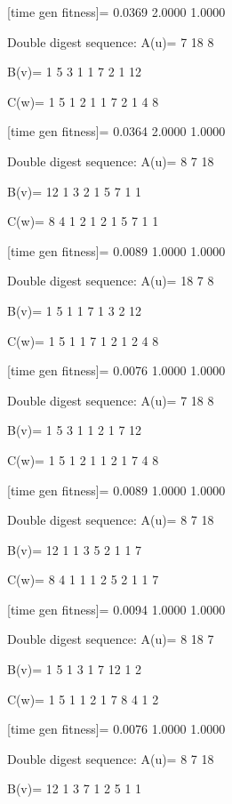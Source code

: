 [time gen fitness]=
    0.0369    2.0000    1.0000

Double digest sequence:
A(u)=
     7    18     8

B(v)=
     1     5     3     1     1     7     2     1    12

C(w)=
     1     5     1     2     1     1     7     2     1     4     8

[time gen fitness]=
    0.0364    2.0000    1.0000

Double digest sequence:
A(u)=
     8     7    18

B(v)=
    12     1     3     2     1     5     7     1     1

C(w)=
     8     4     1     2     1     2     1     5     7     1     1

[time gen fitness]=
    0.0089    1.0000    1.0000

Double digest sequence:
A(u)=
    18     7     8

B(v)=
     1     5     1     1     7     1     3     2    12

C(w)=
     1     5     1     1     7     1     2     1     2     4     8

[time gen fitness]=
    0.0076    1.0000    1.0000

Double digest sequence:
A(u)=
     7    18     8

B(v)=
     1     5     3     1     1     2     1     7    12

C(w)=
     1     5     1     2     1     1     2     1     7     4     8

[time gen fitness]=
    0.0089    1.0000    1.0000

Double digest sequence:
A(u)=
     8     7    18

B(v)=
    12     1     1     3     5     2     1     1     7

C(w)=
     8     4     1     1     1     2     5     2     1     1     7

[time gen fitness]=
    0.0094    1.0000    1.0000

Double digest sequence:
A(u)=
     8    18     7

B(v)=
     1     5     1     3     1     7    12     1     2

C(w)=
     1     5     1     1     2     1     7     8     4     1     2

[time gen fitness]=
    0.0076    1.0000    1.0000

Double digest sequence:
A(u)=
     8     7    18

B(v)=
    12     1     3     7     1     2     5     1     1

